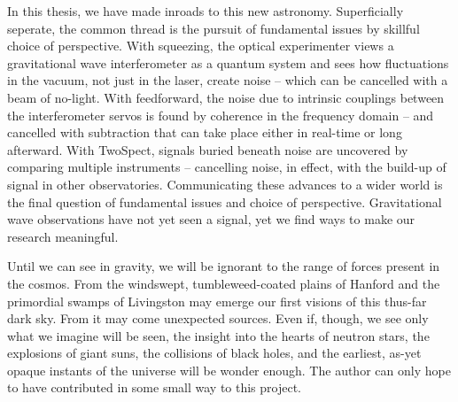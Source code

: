         In this thesis, we have made inroads to this new astronomy. Superficially seperate, the common thread is the pursuit of fundamental issues by skillful choice of perspective. 
With squeezing, the optical experimenter views a gravitational wave interferometer as a quantum system and sees how fluctuations in the vacuum, not just in the laser, create noise -- which can be cancelled with a beam of no-light.
With feedforward, the noise due to intrinsic couplings between the interferometer servos is found by coherence in the frequency domain -- and cancelled with subtraction that can take place either in real-time or long afterward.
With TwoSpect, signals buried beneath noise are uncovered by comparing multiple instruments -- cancelling noise, in effect, with the build-up of signal in other observatories.
Communicating these advances to a wider world is the final question of fundamental issues and choice of perspective.
Gravitational wave observations have not yet seen a signal, yet we find ways to make our research meaningful.

Until we can see in gravity, we will be ignorant to the range of forces present in the cosmos. From the windswept, tumbleweed-coated plains of Hanford and the primordial swamps of Livingston may emerge our first visions of this thus-far dark sky. From it may come unexpected sources. Even if, though, we see only what we imagine will be seen, the insight into the hearts of neutron stars, the explosions of giant suns, the collisions of black holes, and the earliest, as-yet opaque instants of the universe will be wonder enough. The author can only hope to have contributed in some small way to this project. 

  

%
%
%

